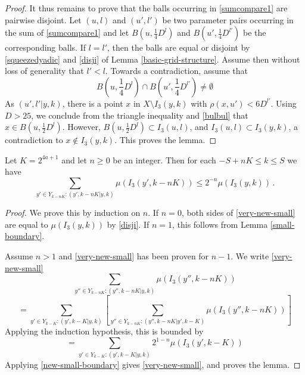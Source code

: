 \begin{proof}
It thus remains to prove that the balls
occurring in
\eqref{sumcompare1} are pairwise disjoint.
Let $(u,l)$ and $(u',l')$ be two parameter pairs occurring
in the sum of \eqref{sumcompare1} and let
$ B(u, \frac 14 D^l)$ and $B({u'}, \frac 14 D^{l'})$
be the corresponding balls. If
$l=l'$, then the balls are equal or disjoint by
\eqref{squeezedyadic} and \eqref{disji} of Lemma \ref{basic-grid-structure}. Assume then without loss of generality that $l'<l$. Towards a contradiction, assume that
\begin{equation}\label{bulbul}
    B(u, \frac 14 D^l)\cap B({u'}, \frac 14 D^{l'})\neq \emptyset
\end{equation}
As $(u',l'|y,k)$, there is a point  $x$ in
$X\setminus I_3(y,k)$ with $\rho(x,u')<6D^{l'}$.
Using $D>25$, we conclude from the triangle inequality and \eqref{bulbul} that
$x\in B(u,\frac 12D^l)$. However, $B(u,\frac 12 D^l)\subset I_3(u,l)$,
and $I_3(u,l)\subset I_3(y,k)$, a contradiction to
$x\not\in I_3(y,k)$.
This proves the lemma.
\end{proof}

\begin{lemma}
\label{smaller-boundary}
Let $K = 2^{4a+1}$
and let $n\ge 0$ be an integer. Then
for each $-S+nK\le k\le S$ we have
   \begin{equation}
        \label{very-new-small}
        \sum_{y'\in Y_{k-nK}: (y',k-nK|y,k)}\mu(I_3(y',k-nK)) \le 2^{-n} \mu(I_3(y,k))\,.
    \end{equation}
\end{lemma}
\begin{proof}
    We prove this by induction on $n$. If $n=0$,
    both sides of \eqref{very-new-small} are equal to
    $\mu(I_3(y,k))$ by \eqref{disji}. If $n=1$, this follows from Lemma \ref{small-boundary}.

    Assume $n>1$ and \eqref{very-new-small} has been proven for  $n-1$.
We write  \eqref{very-new-small}
     \begin{equation}
             \sum_{y''\in Y_{k-nK}: (y'',k-nK|y,k)}\mu(I_3(y'',k-nK))
    \end{equation}
     \begin{equation}
=  \sum_{y'\in Y_{k-K}:(y',k-K|y,k)}   \left[   \sum_{y''\in Y_{k-nK}: (y'',k-nK|y',k-K)}\mu(I_3(y'',k-nK)) \right]
    \end{equation}
Applying the induction hypothesis, this is bounded by
         \begin{equation}
=  \sum_{y'\in Y_{k-K}:(y',k-K|y,k)}   2^{1-n}\mu(I_3(y',k-K))
    \end{equation}
Applying \eqref{new-small-boundary} gives
\eqref{very-new-small}, and proves the lemma.
\end{proof}

